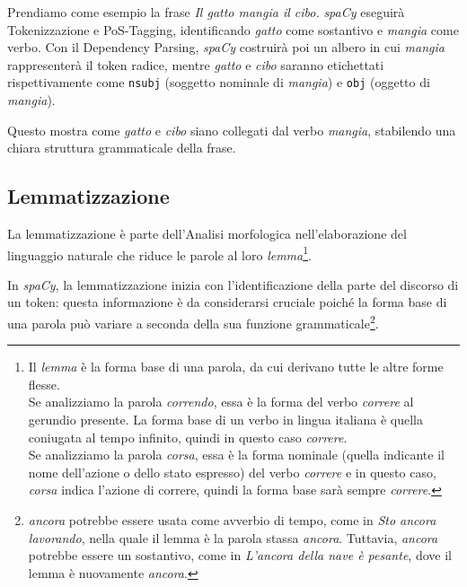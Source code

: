 \documentclass[12pt]{report}
\newcommand{\spacy}{\textsl{spaCy}\xspace}
\begin{document}
\begin{mdframed}
\small
Prendiamo come esempio la frase \textit{Il gatto mangia il cibo.} \spacy eseguirà Tokenizzazione e PoS-Tagging, identificando \textit{gatto} come sostantivo e \textit{mangia} come verbo. Con il Dependency Parsing, \spacy costruirà poi un albero in cui \textit{mangia} rappresenterà il token radice, mentre \textit{gatto} e \textit{cibo} saranno etichettati rispettivamente come \texttt{nsubj} (soggetto nominale di \textit{mangia}) e \texttt{obj} (oggetto di \textit{mangia}).

Questo mostra come \textit{gatto} e \textit{cibo} siano collegati dal verbo \textit{mangia}, stabilendo una chiara struttura grammaticale della frase.
\end{mdframed}


\subsection{Lemmatizzazione}
\label{sec:lemmatizzazione}
La lemmatizzazione è parte dell'\textsf{Analisi morfologica} nell'elaborazione del linguaggio naturale che riduce le parole al loro \textit{lemma}\footnote{Il \textit{lemma} è la forma base di una parola, da cui derivano tutte le altre forme flesse.\\
Se analizziamo la parola \textit{correndo}, essa è la forma del verbo \textit{correre} al gerundio presente. La forma base di un verbo in lingua italiana è quella coniugata al tempo infinito, quindi in questo caso \textit{correre}.\\
Se analizziamo la parola \textit{corsa}, essa è la forma nominale (quella indicante il nome dell'azione o dello stato espresso) del verbo \textit{correre} e in questo caso, \textit{corsa} indica l'azione di correre, quindi la forma base sarà sempre \textit{correre}.\label{fn:lemma}}.

In \spacy, la lemmatizzazione inizia con l'identificazione della parte del discorso di un token: questa informazione è da considerarsi cruciale poiché la forma base di una parola può variare a seconda della sua funzione grammaticale\footnote{\textit{ancora} potrebbe essere usata come avverbio di tempo, come in \textit{Sto ancora lavorando}, nella quale il lemma è la parola stassa \textit{ancora}. Tuttavia, \textit{ancora} potrebbe essere un sostantivo, come in \textit{L'ancora della nave è pesante}, dove il lemma è nuovamente \textit{ancora}.}.
\end{document}
